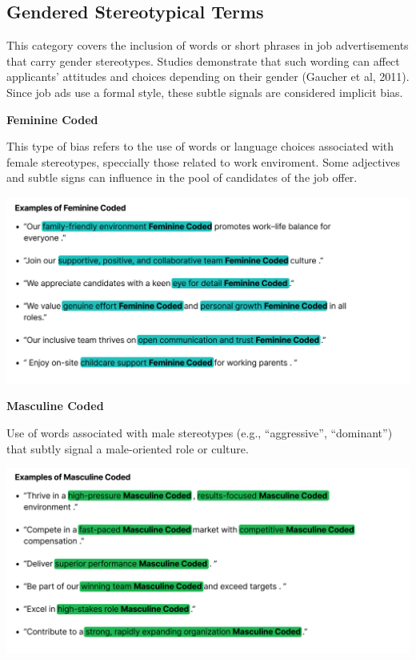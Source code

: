 \documentclass[
]{book}
\begin{document}
\subsection*{Gendered Stereotypical Terms}\label{gender-stereotypical-terms}

This category covers the inclusion of words or short phrases in job advertisements that carry gender stereotypes. Studies demonstrate that such wording can affect applicants' attitudes and choices depending on their gender (Gaucher et al, 2011). Since job ads use a formal style, these subtle signals are considered implicit bias.

{\textbf{Feminine Coded}}

This type of bias refers to the use of words or language choices associated with female stereotypes, speccially those related to work enviroment. Some adjectives and subtle signs can influence in the pool of candidates of the job offer.

\includegraphics{images/Feminine-Coded.png}

{\textbf{Masculine Coded}}

Use of words associated with male stereotypes (e.g., ``aggressive'', ``dominant'') that subtly signal a male-oriented role or culture.

\includegraphics{images/Masculine-Coded.png}
\end{document}
